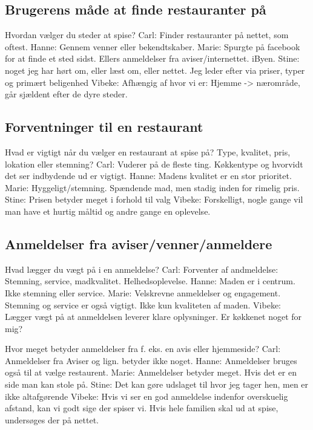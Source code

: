 \documentclass[a4paper, 12pt]{article}
\begin{document}
\subsection{Brugerens måde at finde restauranter på}

  Hvordan vælger du steder at spise?
    Carl: Finder restauranter på nettet, som oftest.
    Hanne: Gennem venner eller bekendtskaber.
    Marie: Spurgte på facebook for at finde et sted sidst. Ellers anmeldelser fra aviser/internettet. iByen.
    Stine: noget jeg har hørt om, eller læst om, eller nettet. Jeg leder efter via priser, typer og primært beligenhed
    Vibeke: Afhængig af hvor vi er: Hjemme -> nærområde, går sjældent efter de dyre steder.

\subsection{Forventninger til en restaurant}

  Hvad er vigtigt når du vælger en restaurant at spise på?
  Type, kvalitet, pris, lokation eller stemning?
    Carl: Vuderer på de fleste ting. Køkkentype og hvorvidt det ser indbydende ud er vigtigt.
    Hanne: Madens kvalitet er en stor prioritet.
    Marie: Hyggeligt/stemning. Spændende mad, men stadig inden for rimelig pris.
    Stine: Prisen betyder meget i forhold til valg
    Vibeke: Forskelligt, nogle gange vil man have et hurtig måltid og andre gange en oplevelse.

\subsection{Anmeldelser fra aviser/venner/anmeldere}

  Hvad lægger du vægt på i en anmeldelse?
    Carl: Forventer af andmeldelse: Stemning, service, madkvalitet. Helhedsoplevelse.
    Hanne: Maden er i centrum. Ikke stemning eller service.
    Marie: Velskrevne anmeldelser og engagement. 
	   Stemning og service er også vigtigt. Ikke kun kvaliteten af maden.
    Vibeke: Lægger vægt på at anmeldelsen leverer klare oplysninger. Er køkkenet noget for
	    mig?

  Hvor meget betyder anmeldelser fra f. eks. en avis eller hjemmeside?
    Carl: Anmeldelser fra Aviser og lign. betyder ikke noget.
    Hanne: Anmeldelser bruges også til at vælge restaurent.
    Marie: Anmeldelser betyder meget. Hvis det er en side man kan stole på.
    Stine: Det kan gøre udslaget til hvor jeg tager hen, men er ikke altafgørende
    Vibeke: Hvis vi ser en god anmeldelse indenfor overskuelig afstand, kan vi godt sige der
	    spiser vi. Hvis hele familien skal ud at spise, undersøges der på nettet.
\end{document}
